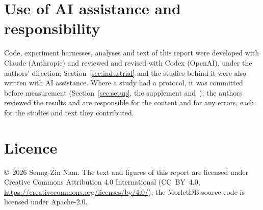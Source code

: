 \documentclass[sigconf]{acmart}
\begin{document}
\section*{Use of AI assistance and responsibility}
Code, experiment harnesses, analyses and text of this report were developed with Claude (Anthropic) and reviewed and revised with Codex (OpenAI), under the authors' direction; Section~\ref{sec:industrial} and the studies behind it were also written with AI assistance. Where a study had a protocol, it was committed before measurement (Section~\ref{sec:setup}, the supplement and~\cite{iu1,iu2,iu1e}); the authors reviewed the results and are responsible for the content and for any errors, each for the studies and text they contributed.

\ifdefined\SigmodSubmission\else
\section*{Licence}
\copyright~2026 Seung-Zin Nam. The text and figures of this report are licensed under Creative Commons Attribution 4.0 International (CC~BY~4.0, \url{https://creativecommons.org/licenses/by/4.0/}); the MorletDB source code is licensed under Apache-2.0.
\end{document}
